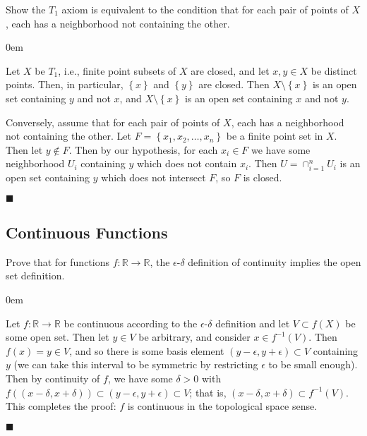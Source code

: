 \documentclass[12pt]{article}
\renewcommand{\qed}{\hfill$\blacksquare$}
\renewenvironment{proof}{\begin{addmargin}[1em]{0em}\begin{newproof}}{\end{newproof}\end{addmargin}\qed}
\newenvironment{problem}[2][Exercise]{\begin{trivlist}
\item[\hskip \labelsep {\bfseries #1}\hskip \labelsep {\bfseries #2.}]}{\end{trivlist}}
\begin{document}
\begin{problem}{17.15}
	Show the $T_1$ axiom is equivalent to the condition that for each pair of points of $X$, each has a neighborhood not containing the other.
\end{problem}
\begin{proof}
	Let $X$ be $T_1$, i.e., finite point subsets of $X$ are closed, and let $x,y \in X$ be distinct points. Then, in particular, $\left\{x\right\}$ and $\left\{y\right\}$ are closed. Then $X\setminus \left\{x\right\}$ is an open set containing $y$ and not $x$, and $X\setminus \left\{x\right\}$ is an open set containing $x$ and not $y$.
	
	Conversely, assume that for each pair of points of $X$, each has a neighborhood not containing the other. Let $F= \left\{x_1,x_2,\ldots,x_n\right\}$ be a finite point set in $X$. Then let $y \notin F$. Then by our hypothesis, for each $x_i\in F$ we have some neighborhood $U_{i}$ containing $y$ which does not contain $x_i$. Then $U = \cap_{i=1}^n U_i$ is an open set containing $y$ which does not intersect $F$, so $F$ is closed.
\end{proof}



\subsection*{Continuous Functions}

\begin{problem}{18.1}
	Prove that for functions $f:\mathbb{R}\rightarrow \mathbb{R}$, the $\epsilon$-$\delta$ definition of continuity implies the open set definition.
\end{problem}
\begin{proof}
	Let $f:\mathbb{R}\rightarrow \mathbb{R}$ be continuous according to the $\epsilon$-$\delta$ definition and let $V\subset f\left(X\right)$ be some open set. Then let $y\in V$ be arbitrary, and consider $x \in f^{-1}\left(V\right)$. Then $f\left(x\right)=y \in V$, and so there is some basis element $\left(y-\epsilon,y+\epsilon\right) \subset V$ containing $y$ (we can take this interval to be symmetric by restricting $\epsilon$ to be small enough). Then by continuity of $f$, we have some $\delta >0$ with $f\left(\left(x-\delta,x+\delta\right)\right) \subset \left(y-\epsilon,y+\epsilon\right) \subset V$; that is, $\left(x-\delta, x+\delta\right) \subset f^{-1}\left(V\right)$. This completes the proof: $f$ is continuous in the topological space sense.
\end{proof}
\end{document}
